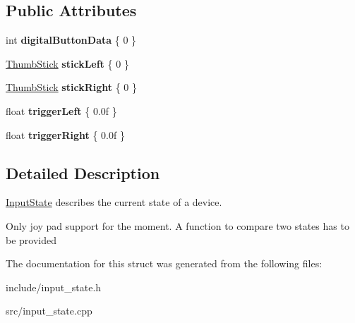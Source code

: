 \subsection*{Public Attributes}
\begin{DoxyCompactItemize}
\item 
\mbox{\label{struct_blade_1_1_input_state_ab2ce303d432538d83d6797e2b0196a54}} 
int {\bfseries digital\+Button\+Data} \{ 0 \}
\item 
\mbox{\label{struct_blade_1_1_input_state_aa67cc30dd00b66ac28e30332fc424796}} 
\hyperlink{struct_blade_1_1_thumb_stick}{Thumb\+Stick} {\bfseries stick\+Left} \{ 0 \}
\item 
\mbox{\label{struct_blade_1_1_input_state_a73a2ab51eb7cbd33f2c75c1c152a2da6}} 
\hyperlink{struct_blade_1_1_thumb_stick}{Thumb\+Stick} {\bfseries stick\+Right} \{ 0 \}
\item 
\mbox{\label{struct_blade_1_1_input_state_a8db118c60d2f8ec3fcd945fcdccb676d}} 
float {\bfseries trigger\+Left} \{ 0.\+0f \}
\item 
\mbox{\label{struct_blade_1_1_input_state_aee406e5fca67a20a0483019150355f87}} 
float {\bfseries trigger\+Right} \{ 0.\+0f \}
\end{DoxyCompactItemize}


\subsection{Detailed Description}
\hyperlink{struct_blade_1_1_input_state}{Input\+State} describes the current state of a device. 

Only joy pad support for the moment. A function to compare two states has to be provided 

The documentation for this struct was generated from the following files\+:\begin{DoxyCompactItemize}
\item 
include/input\+\_\+state.\+h\item 
src/input\+\_\+state.\+cpp\end{DoxyCompactItemize}
